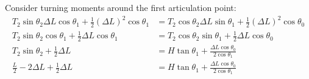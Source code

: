 \documentclass[12pt]{article}
\begin{document}
Consider turning moments around the first articulation point:
\begin{align*}
  T_2\sin\theta_2\Delta L\cos\theta_1 + \frac{1}{2}(\Delta L)^2\cos\theta_1 &=
  T_2\cos\theta_2\Delta L\sin\theta_1 + \frac{1}{2}(\Delta L)^2\cos\theta_0\\
  T_2\sin\theta_2\cos\theta_1 + \frac{1}{2}\Delta L\cos\theta_1 &=
  T_2\cos\theta_2\sin\theta_1 + \frac{1}{2}\Delta L\cos\theta_0\\
  T_2\sin\theta_2 + \frac{1}{2}\Delta L &=
  H\tan\theta_1 + \frac{\Delta L\cos\theta_0}{2\cos\theta_1}\\
  \frac{L}{2} - 2\Delta L + \frac{1}{2}\Delta L &=
  H\tan\theta_1 + \frac{\Delta L\cos\theta_0}{2\cos\theta_1}\\
\end{align*}
\end{document}
